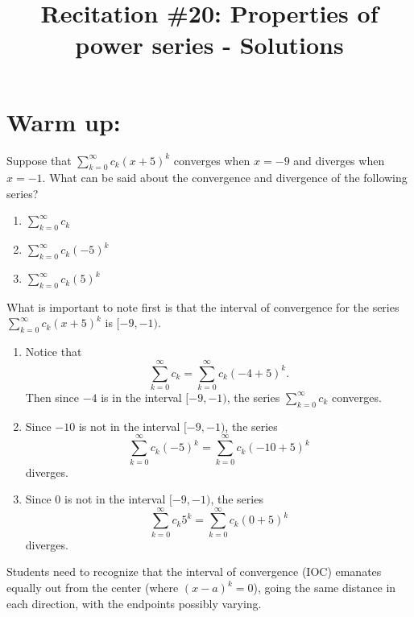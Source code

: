 \documentclass[noinstructornotes]{ximera}
\title{Recitation \#20: Properties of power series - Solutions}
\begin{document}
\begin{abstract}		\end{abstract}
\maketitle



\section{Warm up:}
Suppose that $\sum_{k=0}^\infty c_k (x+5)^k$ converges when $x=-9$ and diverges when $x=-1$.  
What can be said about the convergence and divergence of the following series?
	\begin{multicols}{3}
	\begin{enumerate}
	\item  $\sum_{k=0}^\infty c_k$
	\item  $\sum_{k=0}^\infty c_k (-5)^k$
	\item  $\sum_{k=0}^\infty c_k (5)^k$
	\end{enumerate}
	\end{multicols}
	
	\begin{freeResponse}
	 What is important to note first is that the interval of convergence for the series $\sum_{k=0}^\infty c_k (x+5)^k$ is $[-9,-1)$. 
	
	\begin{enumerate}
	\item  Notice that
		\[
		\sum_{k=0}^\infty c_k = \sum_{k=0}^\infty c_k (-4+5)^k.
		\]
	Then since $-4$ is in the interval $[-9,-1)$, the series $\sum_{k=0}^\infty c_k$ converges.
	
	\item  Since $-10$ is not in the interval $[-9,-1)$, the series
		\[
		 \sum_{k=0}^\infty c_k (-5)^k = \sum_{k=0}^\infty c_k (-10+5)^k
		\]
	diverges.
	
	\item  Since $0$ is not in the interval $[-9,-1)$, the series
		\[
		\sum_{k=0}^\infty c_k 5^k = \sum_{k=0}^\infty c_k (0+5)^k
		\]
	diverges.
	\end{enumerate}
	\end{freeResponse}
	
\begin{instructorNotes}
Students need to recognize that the interval of convergence (IOC) emanates equally out from the center (where $(x-a)^k = 0$), going the same distance in each direction, with the endpoints possibly varying.
\end{instructorNotes}
\end{document}
